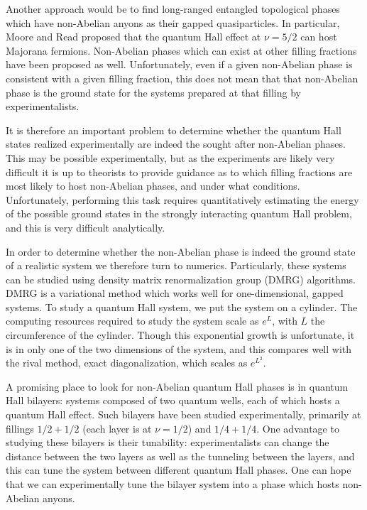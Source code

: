 Another approach would be to find long-ranged entangled topological phases which have non-Abelian anyons as their gapped quasiparticles. In particular, Moore and Read\cite{MooreRead} proposed that the quantum Hall effect at $\nu=5/2$ can host Majorana fermions. Non-Abelian phases which can exist at other filling fractions have been proposed as well\cite{Read-PhysRevB.59.8084,BondersonSlingerland}. Unfortunately, even if a given non-Abelian phase is consistent with a given filling fraction, this does not mean that that non-Abelian phase is the ground state for the systems prepared at that filling by experimentalists. 

It is therefore an important problem to determine whether the quantum Hall states realized experimentally are indeed the sought after non-Abelian phases. This may be possible experimentally, but as the experiments are likely very difficult it is up to theorists to provide guidance as to which filling fractions are most likely to host non-Abelian phases, and under what conditions. Unfortunately, performing this task requires quantitatively estimating the energy of the possible ground states in the strongly interacting quantum Hall problem, and this is very difficult analytically.

In order to determine whether the non-Abelian phase is indeed the ground state of a realistic system we therefore turn to numerics. Particularly, these systems can be studied using density matrix renormalization group (DMRG) algorithms\cite{ZaletelQHdmrg13, ZaletelMixing}. DMRG is a variational method which works well for one-dimensional, gapped systems. To study a quantum Hall system, we put the system on a cylinder. The computing resources required to study the system scale as $e^L$, with $L$ the circumference of the cylinder. Though this exponential growth is unfortunate, it is in only one of the two dimensions of the system, and this compares well with the rival method, exact diagonalization, which scales as $e^{L^2}$. 

A promising place to look for non-Abelian quantum Hall phases is in quantum Hall bilayers: systems composed of two quantum wells, each of which hosts a quantum Hall effect. Such bilayers have been studied experimentally, primarily at fillings $1/2+1/2$ (each layer is at $\nu=1/2$) and $1/4+1/4$\cite{JimReview}. One advantage to studying these bilayers is their tunability: experimentalists can change the distance between the two layers as well as the tunneling between the layers, and this can tune the system between different quantum Hall phases. One can hope that we can experimentally tune the bilayer system into a phase which hosts non-Abelian anyons.

